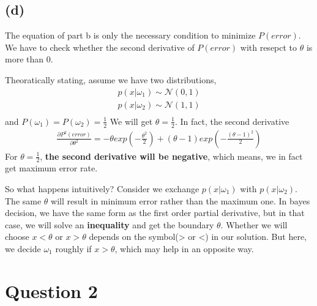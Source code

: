 \documentclass{article}
\newcommand{\question}[1]{\section*{Question #1}}
\renewcommand{\part}[1]{\subsection*{(#1)}}
\begin{document}
\part{d}
The equation of part b is only the necessary condition to minimize $P(error)$. We have to check whether the second derivative of $P(error)$ with resepct to $\theta$ is more than 0.\par
Theoratically stating, assume we have two distributions,
\begin{align*}
  p(x|\omega_1) \sim \mathcal N(0, 1) \\
  p(x|\omega_2) \sim \mathcal N(1, 1) \\
\end{align*}
and $P(\omega_1) = P(\omega_2) = \frac{1}{2}$
We will get $\theta = \frac{1}{2}$. In fact, the second derivative
\begin{align*}
  \frac{\partial P^2(error)}{\partial \theta^2} = -\theta exp(-\frac{\theta^2}{2}) + (\theta - 1)exp(-\frac{(\theta - 1)^2}{2})
\end{align*}
For $\theta = \frac{1}{2}$, \textbf{the second derivative will be negative}, which means, we in fact get maximum error rate.\par
So what happens intuitively? Consider we exchange $p(x|\omega_1)$ with $p(x|\omega_2)$. The same $\theta$ will result in minimum error rather than the maximum one. In bayes decision, we have the same form as the first order partial derivative, but in that case, we will solve an \textbf{inequality} and get the boundary $\theta$. Whether we will choose $x < \theta$ or $x > \theta$ depends on the symbol(> or <) in our solution. But here, we decide $\omega_1$ roughly if $x > \theta$, which may help in an opposite way.

\question{2}
\end{document}
